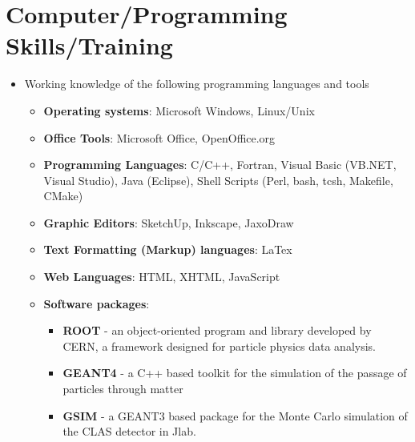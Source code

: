 \documentclass[10pt, letterpaper]{article}
\begin{document}
\section*{Computer/Programming Skills/Training}
\noindent
\begin{itemize}
\item Working knowledge of the following programming languages and tools
  \begin{itemize} 
  \item \textbf{Operating systems}: Microsoft Windows, Linux/Unix 
  \item \textbf{Office Tools}: Microsoft Office, OpenOffice.org
  \item \textbf{Programming Languages}: C/C++, Fortran, Visual Basic (VB.NET, Visual Studio), Java (Eclipse), Shell Scripts (Perl, bash, tcsh, Makefile, CMake)
  \item \textbf{Graphic Editors}: SketchUp, Inkscape, JaxoDraw
  \item \textbf{Text Formatting (Markup) languages}: LaTex
  \item \textbf{Web Languages}: HTML, XHTML, JavaScript %
  \item \textbf{Software packages}:
    \begin{itemize}
    \item \textbf{ROOT} - an object-oriented program and library developed by CERN, a framework designed for particle physics data analysis.
    \item \textbf{GEANT4} - a C++ based toolkit for the simulation of the passage of particles through matter
    \item \textbf{GSIM} - a GEANT3 based package for the Monte Carlo simulation of the CLAS detector in Jlab.	
    \end{itemize}
\end{itemize}
\end{itemize}
\end{document}
